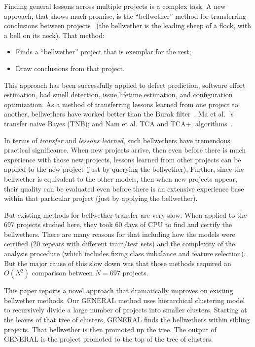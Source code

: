 \documentclass[10pt,journal,compsoc]{IEEEtran}
\newcommand{\bi}{\begin{itemize}}
\newcommand{\ei}{\end{itemize}}
\begin{document}
Finding general lessons across multiple projects is a complex task.
A new approach, that shows much promise,
is the ``bellwether'' method
 for   transferring conclusions between   projects~\cite{krishna2018bellwethers,krishna16a,mensah18z,mensah2017stratification,mensah2017investigating}  (the bellwether is the  leading sheep of a flock, with a bell on its neck).  That method:
\bi
\item Finds a  ``bellwether'' project that is exemplar for the rest;
\item Draw conclusions from  that project.
\ei
This approach has been successfully applied to defect prediction, software effort estimation, bad smell detection, issue lifetime estimation, and configuration optimization. As a 
method of transferring lessons learned from one project to another, bellwethers have worked better than the Burak filter~\cite{turhan09}, Ma et al.~\cite{Ma2012}'s transfer naive Bayes (TNB); and Nam et al.  TCA  and TCA+, algorithms~\cite{Nam13,Nam2015}.

In terms of {\em transfer} and {\em lessons learned},  such bellwethers have
  tremendous practical significance.  When new projects arrive, then even before there is much experience with those new projects,  lessons learned from other projects can be applied to the new project (just by querying the bellwether),
 Further, since the bellwether is equivalent to the other models,
 then when new projects appear, their quality can be evaluated even before there is an extensive experience base within that particular project (just by applying the bellwether).
 

But existing  methods for bellwether transfer are very slow. When applied to the 697 projects studied here, they took 60 days of CPU to find and certify the bellwethers. There are many reasons for that including how the models were certified (20 repeats  with different train/test sets)
and the complexity of the analysis procedure (which includes fixing class imbalance and feature selection). But the major cause of this slow down was that those   methods  required an $O(N^2)$ comparison between   $N=697$ projects.



This paper reports a novel approach  that dramatically improves on existing bellwether methods.
 Our GENERAL  method  uses hierarchical clustering model to recursively divide a large number of projects into smaller clusters. Starting at the leaves of that tree of clusters, GENERAL finds the    bellwethers within sibling projects. That bellwether is then promoted up the tree. The output of GENERAL is the project promoted to the top of the tree of clusters. 
 
\end{document}
